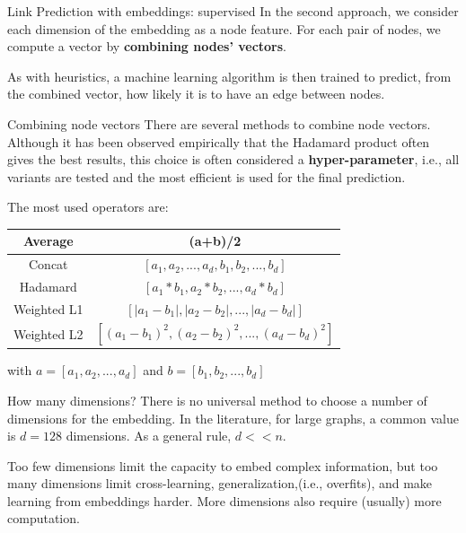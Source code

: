 \documentclass[a4paper,11pt]{book}
\begin{document}
\begin{textbox}{Link Prediction with embeddings: supervised}
In the second approach, we consider each dimension of the embedding as a node feature. For each pair of nodes, we compute a vector by \textbf{combining nodes' vectors}.

As with heuristics, a machine learning algorithm is then trained to predict, from the combined vector, how likely it is to have an edge between nodes.
\end{textbox}




\begin{textbox}{Combining node vectors}
There are several methods to combine node vectors. Although it has been observed empirically that the Hadamard product often gives the best results, this choice is often considered a \textbf{hyper-parameter}, i.e., all variants are tested and the most efficient is used for the final prediction.

The most used operators are:
\begin{center}
\begin{tabular}{ c| c }
\hline
 Average & (a+b)/2 \\ 
 \hline
 Concat & $[a_1,a_2,...,a_d,b_1,b_2,...,b_d]$\\  
 Hadamard & $[a_1*b_1,a_2*b_2,...,a_d*b_d]$  \\
  Weighted L1 & $[|a_1-b_1|,|a_2-b_2|,...,|a_d-b_d|]$ \\ 
 Weighted L2 & $[(a_1-b_1)^2,(a_2-b_2)^2,...,(a_d-b_d)^2]$\\  
 \hline
\end{tabular}

with $a=[a_1,a_2,...,a_d]$ and $b=[b_1,b_2,...,b_d]$
\end{center}
\end{textbox}


\begin{textbox}{How many dimensions?}
There is no universal method to choose a number of dimensions for the embedding. In the literature, for large graphs, a common value is $d=128$ dimensions. As a general rule, $d<<n$.

Too few dimensions limit the capacity to embed complex information, but too many dimensions limit cross-learning, generalization,(i.e., overfits), and make learning from embeddings harder. More dimensions also require (usually) more computation.
\end{textbox}
\end{document}
